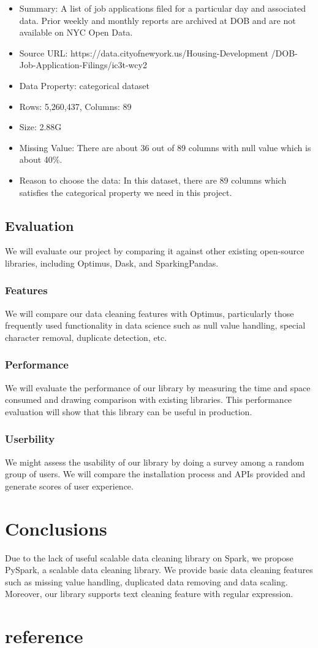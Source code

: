 \documentclass[sigconf]{acmart}
\begin{document}
\begin{itemize}
	\item{Summary: A list of job applications filed for a particular day and associated data. Prior weekly and monthly reports are archived at DOB and are not available on NYC Open Data.}
	\item{Source URL: https://data.cityofnewyork.us/Housing-Development
	/DOB-Job-Application-Filings/ic3t-wcy2}
	\item{Data Property: categorical dataset}
	\item{Rows: 5,260,437, Columns: 89}
	\item{Size: 2.88G}
	\item{Missing Value: There are about 36 out of 89 columns with null value which is about 40\%.}
	\item{Reason to choose the data: In this dataset, there are 89 columns which satisfies the categorical property we need in this project.}
\end{itemize}
\subsection{Evaluation}
We will evaluate our project by comparing it against other existing open-source libraries, including Optimus\cite{optimus}, Dask\cite{dask}, and SparkingPandas\cite{sparklingpandas}. 
\subsubsection{Features}
We will compare our data cleaning features with Optimus, particularly those frequently used functionality in data science such as null value handling, special character removal, duplicate detection, etc. 
\subsubsection{Performance}
We will evaluate the performance of our library by measuring the time and space consumed and drawing comparison with existing libraries. This performance evaluation will show that this library can be useful in production. 
\subsubsection{Userbility}
We might assess the usability of our library by doing a survey among a random group of users. We will compare the installation process and APIs provided and generate scores of user experience.

\section{Conclusions}
Due to the lack of useful scalable data cleaning library on Spark, we propose PySpark, a scalable data cleaning library. We provide basic data cleaning features such as missing value handling, duplicated data removing and data scaling. Moreover, our library supports text cleaning feature with regular expression.

\section{reference}


\end{document}
